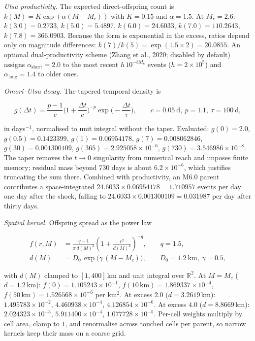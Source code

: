 \documentclass[11pt,a4paper]{article}
\newcommand{\R}{\mathbb{R}}
\begin{document}
\emph{Utsu productivity.} The expected direct-offspring count is
$k(M)=K\exp(\alpha(M-M_c))$ with $K=0.15$ and $\alpha=1.5$. At $M_c=2.6$:
$k(3.0)=0.2733$, $k(5.0)=5.4897$, $k(6.0)=24.6033$, $k(7.0)=110.2643$,
$k(7.8)=366.0903$. Because the form is exponential in the excess, ratios
depend only on magnitude differences: $k(7)/k(5)=\exp(1.5\times2)=20.0855$.
An optional dual-productivity scheme (Zhang et al., 2020; disabled by
default) assigns $\alpha_{\text{short}}=2.0$ to the most recent
$h\,10^{-bM_c}$ events ($h=2\times10^5$) and $\alpha_{\text{long}}=1.4$ to
older ones.

\emph{Omori--Utsu decay.} The tapered temporal density is

\begin{equation}
g(\Delta t)=\frac{p-1}{c}\Big(1+\frac{\Delta t}{c}\Big)^{-p}
\exp\!\Big(-\frac{\Delta t}{\tau}\Big),\qquad
c=0.05\ \text{d},\ p=1.1,\ \tau=100\ \text{d},
\end{equation}

in days$^{-1}$, normalised to unit integral without the taper. Evaluated:
$g(0)=2.0$, $g(0.5)=0.1423399$, $g(1)=0.06954178$, $g(7)=0.008062846$,
$g(30)=0.001300109$, $g(365)=2.925058\times10^{-6}$,
$g(730)=3.546986\times10^{-8}$. The taper removes the $t\to0$ singularity
from numerical reach and imposes finite memory; residual mass beyond $730$
days is about $6.2\times10^{-6}$, which justifies truncating the sum there.
Combined with productivity, an M6.0 parent contributes a space-integrated
$24.6033\times0.06954178=1.710957$ events per day one day after the shock,
falling to $24.6033\times0.001300109=0.031987$ per day after thirty days.

\emph{Spatial kernel.} Offspring spread as the power law

\begin{align}
f(r,M)&=\frac{q-1}{\pi\,d(M)^2}
\left(1+\frac{r^2}{d(M)^2}\right)^{-q},\qquad q=1.5,\\
d(M)&=D_0\,\exp\!\big(\gamma\,(M-M_c)\big),\qquad
D_0=1.2\ \text{km},\ \gamma=0.5,
\end{align}

with $d(M)$ clamped to $[1,400]$\,km and unit integral over $\R^2$. At
$M=M_c$ ($d=1.2$\,km): $f(0)=1.105243\times10^{-1}$,
$f(10\,\text{km})=1.869337\times10^{-4}$,
$f(50\,\text{km})=1.526568\times10^{-6}$ per km$^2$. At excess $2.0$
($d=3.2619$\,km): $1.495783\times10^{-2}$, $4.460938\times10^{-4}$,
$4.126854\times10^{-6}$. At excess $4.0$ ($d=8.8669$\,km):
$2.024323\times10^{-3}$, $5.911400\times10^{-4}$,
$1.077728\times10^{-5}$. Per-cell weights multiply by cell area, clamp to
$1$, and renormalise across touched cells per parent, so narrow kernels keep
their mass on a coarse grid.
\end{document}
